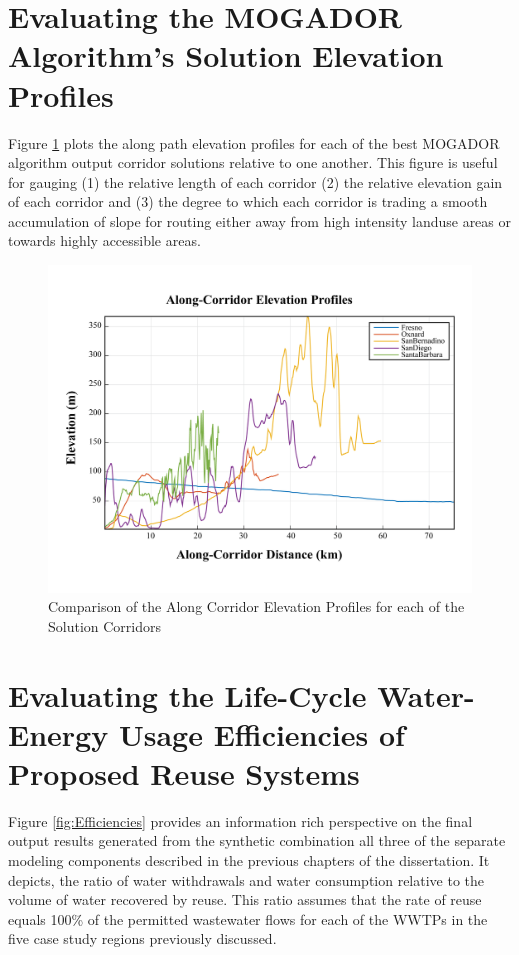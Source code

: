 \section{Evaluating the MOGADOR Algorithm's Solution Elevation Profiles}

Figure \ref{fig:ElevationProfiles} plots the along path elevation profiles for each of the best MOGADOR algorithm output corridor solutions relative to one another. This figure is useful for gauging (1) the relative length of each corridor (2) the relative elevation gain of each corridor and (3) the degree to which each corridor is trading a smooth accumulation of slope for routing either away from high intensity landuse areas or towards highly accessible areas. 

    \begin{figure}[!h]
        \begin{center}
        \includegraphics[width=5.5in]{figures/ElevationProfiles.png}
        \caption{Comparison of the Along Corridor Elevation Profiles for each of the Solution Corridors}
        \label{fig:ElevationProfiles}
        \end{center}
    \end{figure}
    
\section{Evaluating the Life-Cycle Water-Energy Usage Efficiencies of Proposed Reuse Systems}
    
Figure \ref{fig:Efficiencies} provides an information rich perspective on the final output results generated from the synthetic combination all three of the separate modeling components described in the previous chapters of the dissertation. It depicts, the ratio of water withdrawals and water consumption relative to the volume of water recovered by reuse. This ratio assumes that the rate of reuse equals 100\% of the permitted wastewater flows for each of the WWTPs in the five case study regions previously discussed. 

